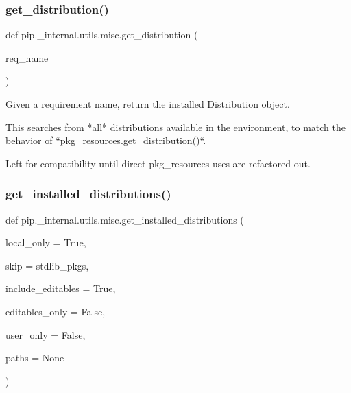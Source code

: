 \mbox{\label{namespacepip_1_1__internal_1_1utils_1_1misc_af3cb03fe12b81f4d3c60e01ecd9cd29c}} 
\subsubsection{\texorpdfstring{get\+\_\+distribution()}{get\_distribution()}}
{\footnotesize\ttfamily def pip.\+\_\+internal.\+utils.\+misc.\+get\+\_\+distribution (\begin{DoxyParamCaption}\item[{}]{req\+\_\+name }\end{DoxyParamCaption})}

\begin{DoxyVerb}Given a requirement name, return the installed Distribution object.

This searches from *all* distributions available in the environment, to
match the behavior of ``pkg_resources.get_distribution()``.

Left for compatibility until direct pkg_resources uses are refactored out.
\end{DoxyVerb}
 \mbox{\label{namespacepip_1_1__internal_1_1utils_1_1misc_acac488b93258d2a3640442c6d29b24c5}} 
\subsubsection{\texorpdfstring{get\+\_\+installed\+\_\+distributions()}{get\_installed\_distributions()}}
{\footnotesize\ttfamily def pip.\+\_\+internal.\+utils.\+misc.\+get\+\_\+installed\+\_\+distributions (\begin{DoxyParamCaption}\item[{}]{local\+\_\+only = {\ttfamily True},  }\item[{}]{skip = {\ttfamily stdlib\+\_\+pkgs},  }\item[{}]{include\+\_\+editables = {\ttfamily True},  }\item[{}]{editables\+\_\+only = {\ttfamily False},  }\item[{}]{user\+\_\+only = {\ttfamily False},  }\item[{}]{paths = {\ttfamily None} }\end{DoxyParamCaption})}

